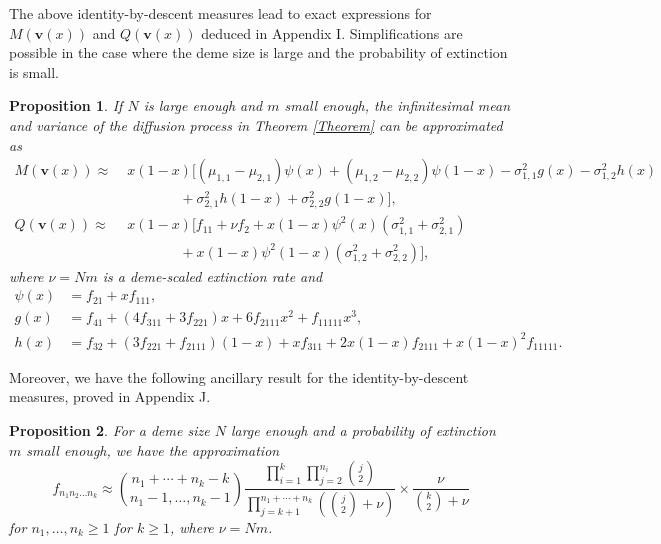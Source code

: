\documentclass[11pt]{article}
\newtheorem{Proposition}{Proposition}
\begin{document}
The above identity-by-descent measures lead to exact expressions for $M(\mathbf{v}(x))$ and $Q(\mathbf{v}(x))$ deduced in Appendix I. Simplifications are possible in the case where the deme size is large and the probability of extinction is small.

\begin{Proposition}\label{Proposition7}
If $N$ is large enough and $m$ small enough, the infinitesimal mean and variance of the diffusion process in Theorem \ref{Theorem} can be approximated as
\begin{subequations}\label{sec5-eq1}
\begin{align}
M(\mathbf{v}(x))\approx &\;x(1-x)\Big[(\mu_{1,1}-\mu_{2,1})\psi(x)+(\mu_{1,2}-\mu_{2,2})\psi(1-x)-\sigma_{1,1}^2g(x)-\sigma_{1,2}^2h(x)\nonumber\\
&\quad\quad\quad\quad+\sigma_{2,1}^2h(1-x)+\sigma_{2,2}^2g(1-x)\Big],\\
Q(\mathbf{v}(x))\approx &\;x(1-x)\Big[f_{11}+\nu f_2+x(1-x)\psi^2(x)\left(\sigma^2_{1,1}+\sigma^2_{2,1}\right)\nonumber\\
&\quad\quad\quad\quad+x(1-x)\psi^2(1-x)\left(\sigma^2_{1,2}+\sigma^2_{2,2}\right)\Big],
\end{align}
\end{subequations}
where $\nu=Nm$ is a deme-scaled extinction rate and
\begin{subequations}\label{sec5-eq2}
\begin{align}
\psi(x)&=f_{21}+xf_{111},\\
g(x)&=f_{41}+(4f_{311}+3f_{221})x+6f_{2111}x^2+f_{11111}x^3,\\
h(x)&=f_{32}+\left(3f_{221}+f_{2111}\right)(1-x)+xf_{311}+2x(1-x)f_{2111}+x(1-x)^2f_{11111}.
\end{align}
\end{subequations}
\end{Proposition}

Moreover, we have the following ancillary result for the identity-by-descent measures, proved in Appendix J.

\begin{Proposition}\label{Proposition8}
For a deme size $N$ large enough and a probability of extinction $m$ small enough, we have the approximation
 \begin{equation}\label{identity}
f_{n_1n_2\ldots n_k}\approx \binom{n_1+\cdots+n_k-k}{n_1-1,\ldots,n_k-1}\frac{\prod_{i=1}^{k}\prod_{j=2}^{n_i}\binom{j}{2}}
{\prod_{j=k+1}^{n_1+\cdots+n_k}\left(\binom{j}{2}+\nu\right)}\times\frac{\nu}{\binom{k}{2}+\nu}
\end{equation}
for $n_1, \ldots, n_k \geq 1$ for $k\geq 1$, where $\nu=Nm$.
\end{Proposition}
\end{document}
